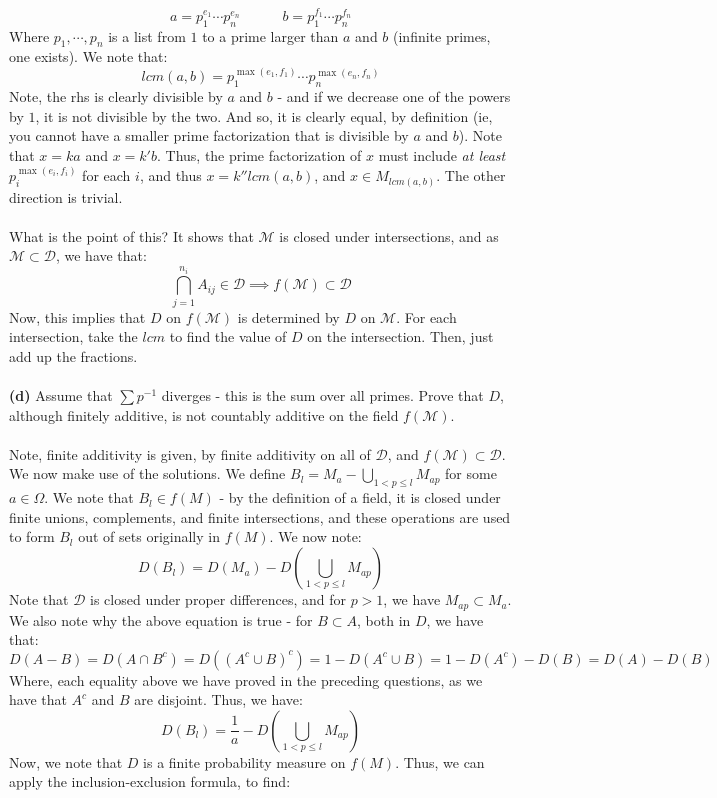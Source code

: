 \documentclass[12pt,a4paper]{article}
\newcommand{\1}[1]{\mathbbm{1}\left\{ #1 \right\}}
\newcommand{\dcal}{\mathcal{D}}
\newcommand{\mcal}{\mathcal{M}}
\begin{document}
$$
	a = p_1^{e_1} \cdots p_n^{e_n} \quad\quad\quad
	b = p_1^{f_1} \cdots p_n^{f_n}
$$
Where $p_1, \cdots, p_n$ is a list from $1$ to a prime larger than $a$ and $b$ (infinite primes, one exists). We note that:
$$
	lcm(a,b) = p_1^{\max(e_1,f_1)} \cdots p_n^{\max(e_n,f_n)}
$$
Note, the rhs is clearly divisible by $a$ and $b$ - and if we decrease one of the powers by $1$, it is not divisible by the two. And so, it is clearly equal, by definition (ie, you cannot have a smaller prime factorization that is divisible by $a$ and $b$). Note that $x = ka$ and $x = k'b$. Thus, the prime factorization of $x$ must include \textit{at least} $p_i^{\max(e_i,f_i)}$ for each $i$, and thus $x = k''lcm(a,b)$, and $x \in M_{lcm(a,b)}$. The other direction is trivial.
\\\\
What is the point of this? It shows that $\mcal$ is closed under intersections, and as $\mcal \subset \dcal$, we have that:
$$
	\bigcap_{j=1}^{n_i} A_{ij} \in \dcal \implies f(\mcal) \subset \dcal
$$
Now, this implies that $D$ on $f(\mcal)$ is determined by $D$ on $\mcal$. For each intersection, take the $lcm$ to find the value of $D$ on the intersection. Then, just add up the fractions.
\\\\
\textbf{(d)} Assume that $\sum p^{-1}$ diverges - this is the sum over all primes. Prove that $D$, although finitely additive, is not countably additive on the field $f(\mcal)$.
\\\\
Note, finite additivity is given, by finite additivity on all of $\dcal$, and $f(\mcal) \subset \dcal$. We now make use of the solutions. We define $B_l = M_a - \bigcup_{1 < p \leq l} M_{ap}$ for some $a \in \Omega$. We note that $B_l \in f(M)$ - by the definition of a field, it is closed under finite unions, complements, and finite intersections, and these operations are used to form $B_l$ out of sets originally in $f(M)$. We now note:
$$
	D(B_l) = D(M_a) - D\left(\bigcup_{1 < p \leq l} M_{ap}\right)
$$
Note that $\dcal$ is closed under proper differences, and for $p > 1$, we have $M_{ap} \subset M_a$. We also note why the above equation is true - for $B \subset A$, both in $D$, we have that:
$$
	D(A - B) = D(A \cap B^c) = D((A^c \cup B)^c) = 1 - D(A^c \cup B) = 1 - D(A^c) - D(B) = D(A) - D(B)
$$
Where, each equality above we have proved in the preceding questions, as we have that $A^c$ and $B$ are disjoint. Thus, we have:
$$
	D(B_l) = \frac{1}{a} - D\left(\bigcup_{1 < p \leq l} M_{ap}\right)
$$
Now, we note that $D$ is a finite probability measure on $f(M)$. Thus, we can apply the inclusion-exclusion formula, to find:
\end{document}
